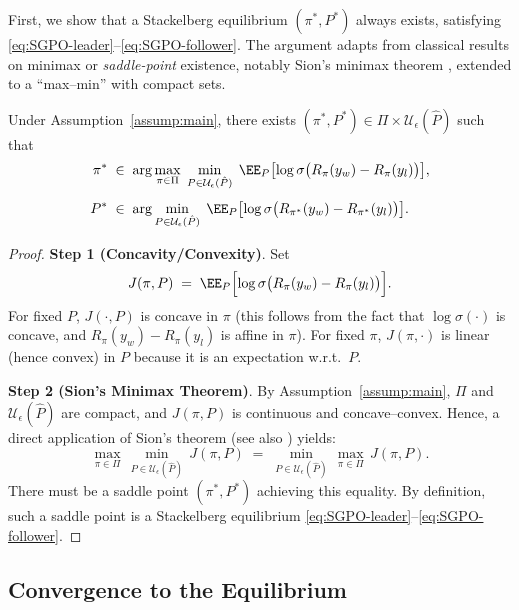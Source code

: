 First, we show that a Stackelberg equilibrium $(\pi^*,P^*)$ always exists, satisfying \eqref{eq:SGPO-leader}--\eqref{eq:SGPO-follower}.  The argument adapts from classical results on minimax or \emph{saddle-point} existence, notably Sion’s minimax theorem \cite{sion1958general}, extended to a “max--min” with compact sets.

\begin{theorem}
\label{thm:existence}
Under Assumption~\ref{assump:main}, there exists $(\pi^*, P^*) \in \Pi \times \mathcal{U}_\epsilon(\hat{P})$ such that
\begin{align}
\pi^*
&\;\in\;
\arg\max_{\pi\in \Pi}\;\min_{P \in \mathcal{U}_\epsilon(\hat{P})}
\;\EE_P\bigl[\log\sigma\bigl(R_\pi(y_w)-R_\pi(y_l)\bigr)\bigr],
\\[4pt]
P^*
&\;\in\;
\arg\min_{P \in \mathcal{U}_\epsilon(\hat{P})}
\;\EE_P\bigl[\log\sigma\bigl(R_{\pi^*}(y_w)-R_{\pi^*}(y_l)\bigr)\bigr].
\end{align}
\end{theorem}

\begin{proof}
\textbf{Step 1 (Concavity/Convexity)}.  
Set 
\[
J(\pi,P) \;=\;
\EE_{P}\Bigl[\log\sigma\bigl(R_\pi(y_w)-R_\pi(y_l)\bigr)\Bigr].
\]
For fixed $P$, $J(\cdot,P)$ is concave in $\pi$ (this follows from the fact that $\log\sigma(\cdot)$ is concave, and $R_\pi(y_w)-R_\pi(y_l)$ is affine in $\pi$).  For fixed $\pi$, $J(\pi,\cdot)$ is linear (hence convex) in $P$ because it is an expectation w.r.t.\ $P$.

\smallskip
\noindent
\textbf{Step 2 (Sion’s Minimax Theorem)}.  
By Assumption~\ref{assump:main}, $\Pi$ and $\mathcal{U}_\epsilon(\hat{P})$ are compact, and $J(\pi,P)$ is continuous and concave--convex.  Hence, a direct application of Sion’s theorem \cite{sion1958general} (see also \cite[\S C.5]{bertsekas2009convex}) yields:
\[
\max_{\pi\in \Pi}\,\min_{P\in \mathcal{U}_\epsilon(\hat{P})}\,J(\pi,P)
\;=\;
\min_{P\in \mathcal{U}_\epsilon(\hat{P})}\,\max_{\pi\in \Pi}\,J(\pi,P).
\]
There must be a saddle point $(\pi^*,P^*)$ achieving this equality.  By definition, such a saddle point is a Stackelberg equilibrium \eqref{eq:SGPO-leader}--\eqref{eq:SGPO-follower}.
\end{proof}

\subsection{Convergence to the Equilibrium}
\label{sec:convergence}

